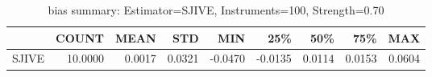 \begin{table}[ht]
\centering
\caption{bias summary: Estimator=SJIVE, Instruments=100, Strength=0.70}
\begin{tabular}{lrrrrrrrr}
\toprule
 & COUNT & MEAN & STD & MIN & 25\% & 50\% & 75\% & MAX \\
\midrule
SJIVE & 10.0000 & 0.0017 & 0.0321 & -0.0470 & -0.0135 & 0.0114 & 0.0153 & 0.0604 \\
\bottomrule
\end{tabular}
\end{table}

